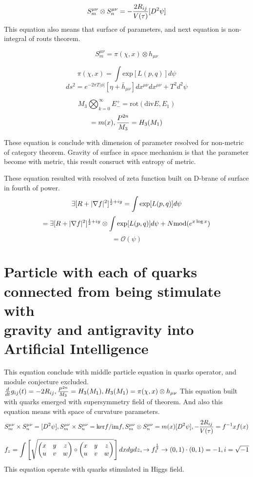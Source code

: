 \documentclass{jsarticle}
\begin{document}
  $$  S^{\mu\nu}_m \otimes S^{\mu\nu}_n  = -{2 R_{ij} \over V(\tau)}[D^2 \psi] $$
This equation also means that surface of parameters, and next equation is non-integral of routs theorem.

   $$ S^{\mu\nu}_m  = \pi(\chi,x) \otimes h_{\mu\nu} $$

   $$ \pi (\chi,x) = \int \mathrm{exp}[L(p,q)]d\psi $$
   $$ ds^2 = e^{-2\pi T|\phi|}[\eta + \bar{h}_{\mu\nu}]dx^{\mu\nu}dx^{\mu\nu} + T^2 d^2\psi $$

   $$ M_3 \bigotimes_{k=0}^{\infty} E^{+}_{-} = \mathrm{rot}(\mathrm{div} E, E_1)$$
   $$ = m(x), {P^{2n} \over M_3} = H_3(M_1) $$

   These equation is conclude with dimension of parameter resolved for non-metric of category theorem.
   Gravity of surface in space mechanism is that the parameter become with metric, this result consruct
with entropy of metric. 

  These equation resulted with resolved of zeta function built on D-brane of surface in fourth of power.
$$ \exists [R + |\nabla f|^2]^{{1 \over 2} + iy} = \int \mathrm{exp}[L(p,q)]d\psi $$
$$ = \exists [R + |\nabla f|^2]^{{1 \over 2} + iy} \otimes \int \mathrm{exp}[L(p,q)]d\psi +
N\mathrm{mod}(e^{x \log x}) $$
$$ = \mathcal{O}(\psi) $$

\section{Particle with each of quarks connected from being stimulate with \\
	gravity and antigravity into Artificial Intelligence}


 This equation conclude with middle particle equation in quarks operator, and module conjecture excluded.
 $ {d \over dt}g_{ij}(t) = - 2 R_{ij}, {P^{2n} \over M_3} = H_3(M_1), H_3(M_1) = \pi (\chi, x) \otimes h_{\mu\nu} $
 This equation built with quarks emerged with supersymmetry field of theorem. 
 And also this equation means with space of curvature parameters. $$ S^{\mu\nu}_{m} \times S^{\mu\nu}_{n}
 = [D^2\psi] , S^{\mu\nu}_{m} \times S^{\mu\nu}_{n} = \mathrm{ker}f/\mathrm{im}f,  S^{\mu\nu}_{m} \otimes 
 S^{\mu\nu}_{n} = m(x)[D^2\psi], {-{2R_{ij} \over V(\tau)}} = f^{-1}xf(x) $$
 $$ f_z = \int \left[ \sqrt{\begin{pmatrix} x & y & z \\
			   u & v & w \end{pmatrix} \circ \begin{pmatrix} x & y & z \\
			   u & v & w \end{pmatrix}}_{}\right]dxdydz, \to f_z^{1 \over 2} \to (0,1)\cdot(0,1) = -1,i = 
 \sqrt{-1} $$ This equation operate with quarks stimulated in Higgs field. 
\end{document}
